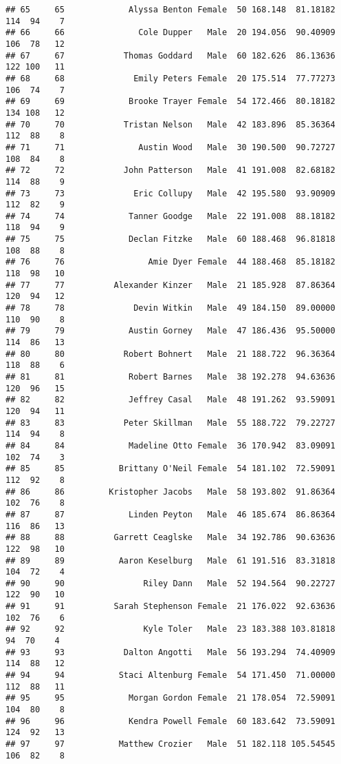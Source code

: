 \documentclass[
]{article}
\begin{document}
\begin{verbatim}
## 65     65             Alyssa Benton Female  50 168.148  81.18182 114  94    7
## 66     66               Cole Dupper   Male  20 194.056  90.40909 106  78   12
## 67     67            Thomas Goddard   Male  60 182.626  86.13636 122 100   11
## 68     68              Emily Peters Female  20 175.514  77.77273 106  74    7
## 69     69             Brooke Trayer Female  54 172.466  80.18182 134 108   12
## 70     70            Tristan Nelson   Male  42 183.896  85.36364 112  88    8
## 71     71               Austin Wood   Male  30 190.500  90.72727 108  84    8
## 72     72            John Patterson   Male  41 191.008  82.68182 114  88    9
## 73     73              Eric Collupy   Male  42 195.580  93.90909 112  82    9
## 74     74             Tanner Goodge   Male  22 191.008  88.18182 118  94    9
## 75     75             Declan Fitzke   Male  60 188.468  96.81818 108  88    8
## 76     76                 Amie Dyer Female  44 188.468  85.18182 118  98   10
## 77     77          Alexander Kinzer   Male  21 185.928  87.86364 120  94   12
## 78     78              Devin Witkin   Male  49 184.150  89.00000 110  90    8
## 79     79             Austin Gorney   Male  47 186.436  95.50000 114  86   13
## 80     80            Robert Bohnert   Male  21 188.722  96.36364 118  88    6
## 81     81             Robert Barnes   Male  38 192.278  94.63636 120  96   15
## 82     82             Jeffrey Casal   Male  48 191.262  93.59091 120  94   11
## 83     83            Peter Skillman   Male  55 188.722  79.22727 114  94    8
## 84     84             Madeline Otto Female  36 170.942  83.09091 102  74    3
## 85     85           Brittany O'Neil Female  54 181.102  72.59091 112  92    8
## 86     86         Kristopher Jacobs   Male  58 193.802  91.86364 102  76    8
## 87     87             Linden Peyton   Male  46 185.674  86.86364 116  86   13
## 88     88          Garrett Ceaglske   Male  34 192.786  90.63636 122  98   10
## 89     89           Aaron Keselburg   Male  61 191.516  83.31818 104  72    4
## 90     90                Riley Dann   Male  52 194.564  90.22727 122  90   10
## 91     91          Sarah Stephenson Female  21 176.022  92.63636 102  76    6
## 92     92                Kyle Toler   Male  23 183.388 103.81818  94  70    4
## 93     93            Dalton Angotti   Male  56 193.294  74.40909 114  88   12
## 94     94           Staci Altenburg Female  54 171.450  71.00000 112  88   11
## 95     95             Morgan Gordon Female  21 178.054  72.59091 104  80    8
## 96     96             Kendra Powell Female  60 183.642  73.59091 124  92   13
## 97     97           Matthew Crozier   Male  51 182.118 105.54545 106  82    8

\end{verbatim}
\end{document}
